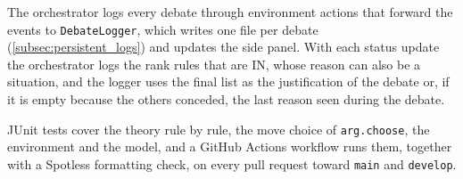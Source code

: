 The orchestrator logs every debate through environment actions that forward the events to \texttt{DebateLogger}, which writes one file per debate (\cref{subsec:persistent_logs}) and updates the side panel.
With each status update the orchestrator logs the rank rules that are IN, whose reason can also be a situation, and the logger uses the final list as the justification of the debate or, if it is empty because the others conceded, the last reason seen during the debate.

JUnit tests cover the theory rule by rule, the move choice of \texttt{arg.choose}, the environment and the model, and a GitHub Actions workflow runs them, together with a Spotless formatting check, on every pull request toward \texttt{main} and \texttt{develop}.
